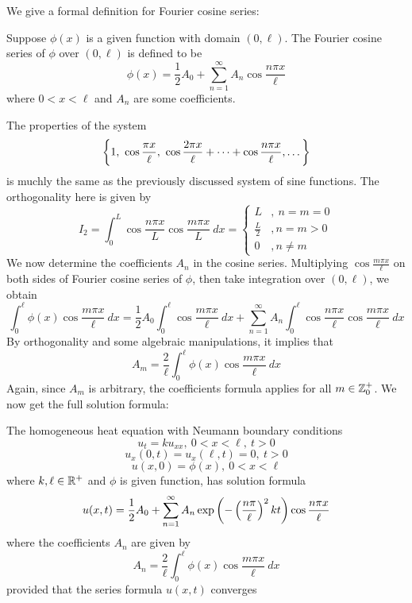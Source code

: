 We give a formal definition for Fourier cosine series:

\medskip 

\begin{defn} 
    Suppose $\phi(x)$ is a given function with domain $(0,\ell)$. The Fourier cosine series of $\phi$ over $(0,\ell)$ is defined to be 
    \[\phi(x) = \frac{1}{2}A_0 + \sum_{n=1}^{\infty} A_n \cos\frac{n\pi x}{\ell}\]
    where $0<x<\ell$ and $A_n$ are some coefficients.
\end{defn}

The properties of the system 
\[\sbr{1,\ \cos\frac{\pi x}{\ell},\ \cos\frac{2\pi x}{\ell} \pd \cos\frac{n\pi x}{\ell},\dots}\]
is muchly the same as the previously discussed system of sine functions. The orthogonality here is given by
\[I_2 = \int_{0}^{L} \cos\frac{n\pi x}{L}\cos\frac{m\pi x}{L}\ dx = \begin{cases}
    L &,\ n=m=0\\
    \frac{L}{2} &, n=m>0\\
    0 &, n\neq m
\end{cases}\]
We now determine the coefficients $A_n$ in the cosine series. Multiplying $\cos \frac{m\pi x}{\ell}$ on both sides of Fourier cosine series of $\phi$, then take integration over $(0,\ell)$, we obtain
\[\int_{0}^{\ell} \phi(x) \cos\frac{m\pi x}{\ell}\ dx = \frac{1}{2}A_0\int_{0}^{\ell}\cos\frac{m\pi x}{\ell}\ dx + \sum_{n=1}^{\infty} A_n \int_{0}^{\ell} \cos\frac{n\pi x}{\ell}\cos\frac{m\pi x}{\ell}\ dx\]
By orthogonality and some algebraic manipulations, it implies that 
\[A_m = \frac{2}{\ell} \int_{0}^{\ell}\phi(x)\cos\frac{m\pi x}{\ell}\ dx\]
Again, since $A_m$ is arbitrary, the coefficients formula applies for all $m\in {\mathbb Z}_0^+$. We now get the full solution formula:

\medskip

\begin{thm}
    The homogeneous heat equation with Neumann boundary conditions
    \[u_t = ku_{xx},\ 0<x<\ell,\ t>0\]
    \[u_x(0,t)=u_x(\ell,t)=0,\ t>0\]
    \[u(x,0) = \phi(x),\ 0<x<\ell\]
    where $k,\ell\in {\mathbb R}^+$ and $\phi$ is given function, has solution formula
    \[u(x,t) = \frac{1}{2}A_0 + \sum_{n=1}^{\infty} A_n \exp\left(-\left(\frac{n\pi }{\ell}\right)^2 kt\right) \cos \frac{n\pi x}{\ell}\]
    where the coefficients $A_n$ are given by 
    \[A_n = \frac{2}{\ell} \int_{0}^{\ell}\phi(x)\cos\frac{m\pi x}{\ell}\ dx\]
    provided that the series formula $u(x,t)$ converges
\end{thm}

